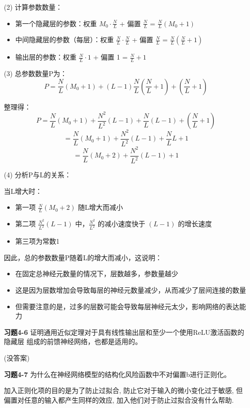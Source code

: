 (2) 计算参数数量：
\begin{itemize}
    \item 第一个隐藏层的参数：权重 $M_0 \cdot \frac{N}{L}$ + 偏置 $\frac{N}{L}$ = $\frac{N}{L}(M_0 + 1)$
    \item 中间隐藏层的参数（每层）：权重 $\frac{N}{L} \cdot \frac{N}{L}$ + 偏置 $\frac{N}{L}$ = $\frac{N}{L}(\frac{N}{L} + 1)$
    \item 输出层的参数：权重 $\frac{N}{L} \cdot 1$ + 偏置 1 = $\frac{N}{L} + 1$
\end{itemize}

(3) 总参数数量P为：
\[
P = \frac{N}{L}(M_0 + 1) + (L-1)\frac{N}{L}(\frac{N}{L} + 1) + (\frac{N}{L} + 1)
\]

整理得：
\[
P = \frac{N}{L}(M_0 + 1) + \frac{N^2}{L^2}(L-1) + \frac{N}{L}(L-1) + (\frac{N}{L} + 1)
\]
\[
= \frac{N}{L}(M_0 + 1) + \frac{N^2}{L^2}(L-1) + \frac{N}{L}L + 1
\]
\[
= \frac{N}{L}(M_0 + 2) + \frac{N^2}{L^2}(L-1) + 1
\]

(4) 分析P与L的关系：

当L增大时：
\begin{itemize}
    \item 第一项 $\frac{N}{L}(M_0 + 2)$ 随L增大而减小
    \item 第二项 $\frac{N^2}{L^2}(L-1)$ 中，$\frac{N^2}{L^2}$ 的减小速度快于 $(L-1)$ 的增长速度
    \item 第三项为常数1
\end{itemize}

因此，总的参数数量P随着L的增大而减小，这说明：
\begin{itemize}
    \item 在固定总神经元数量的情况下，层数越多，参数量越少
    \item 这是因为层数增加会导致每层的神经元数量减少，从而减少了层间连接的数量
    \item 但需要注意的是，过多的层数可能会导致每层神经元太少，影响网络的表达能力
\end{itemize}

\noindent\textbf{习题4-6} 证明通用近似定理对于具有线性输出层和至少一个使用ReLU激活函数的隐藏层
组成的前馈神经网络，也都是适用的。

(没答案)

\noindent\textbf{习题4-7} 为什么在神经网络模型的结构化风险函数中不对偏置b进行正则化。

加入正则化项的目的是为了防止过拟合, 防止它对于输入的微小变化过于敏感, 但偏置对任意的输入都产生同样的效应, 加入他们对于防止过拟合没有什么帮助.

